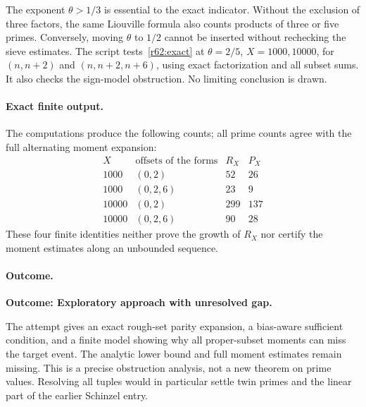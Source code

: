 \documentclass[11pt,a4paper]{article}
\numberwithin{equation}{section}
\begin{document}
The exponent $\theta>1/3$ is essential to the exact indicator. Without the exclusion of three factors, the same Liouville formula also counts products of three or five primes. Conversely, moving $\theta$ to $1/2$ cannot be inserted without rechecking the sieve estimates. The script tests~\eqref{r62:exact} at $\theta=2/5$, $X=1000,10000$, for $(n,n+2)$ and $(n,n+2,n+6)$, using exact factorization and all subset sums. It also checks the sign-model obstruction. No limiting conclusion is drawn.

\paragraph{Exact finite output.}
The computations produce the following counts; all prime counts agree with the full alternating moment expansion:
\[
\begin{array}{c|c|r|r}
 X&\text{offsets of the forms}&R_X&P_X\\ \hline
 1000&(0,2)&52&26\\
 1000&(0,2,6)&23&9\\
 10000&(0,2)&299&137\\
 10000&(0,2,6)&90&28
\end{array}
\]
These four finite identities neither prove the growth of $R_X$ nor certify the moment estimates along an unbounded sequence.

\paragraph{Outcome.}
\textbf{Outcome: Exploratory approach with unresolved gap.}

The attempt gives an exact rough-set parity expansion, a bias-aware sufficient condition, and a finite model showing why all proper-subset moments can miss the target event. The analytic lower bound and full moment estimates remain missing. This is a precise obstruction analysis, not a new theorem on prime values. Resolving all tuples would in particular settle twin primes and the linear part of the earlier Schinzel entry.

\end{document}
